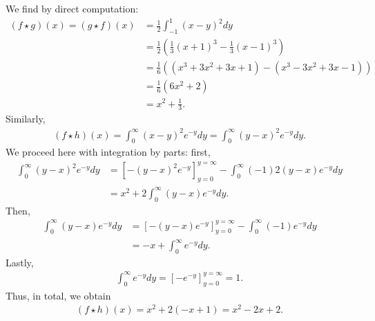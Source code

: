 \documentclass[11pt]{article}
\begin{document}
\begin{solution}
    We find by direct computation:
    \begin{align*}
        (f \star g)(x) = (g \star f)(x) 
        &
        = 
        \frac 1 2 \int_{-1}^1 (x - y)^2 dy
        \\&
        = 
        \frac 1 2 \left( \frac{1}{3} (x+1)^{3} - \frac{1}{3} (x-1)^{3} \right)
        \\&
        = 
        \frac 1 6 
        \left( 
            ( x^{3} + 3x^{2} + 3x + 1 )
            - 
            ( x^{3} - 3x^{2} + 3x - 1 )
        \right)
        \\&
        = 
        \frac 1 6 
        \left( 
            6x^{2} + 2
        \right)
        \\&
        = 
        x^2 + \frac 1 3
        .
    \end{align*}   
    Similarly,
    \begin{align*}
        (f \star h)(x) 
        = 
        \int_{0}^\infty (x - y)^2 e^{-y} dy 
        = 
        \int_{0}^\infty (y - x)^2 e^{-y} dy 
        .
    \end{align*}
    We proceed here with integration by parts: first, 
    \begin{align*}
        \int_{0}^\infty (y - x)^2 e^{-y} dy 
        &=
        \left[ - (y - x)^2 e^{-y} \right]_{y=0}^{y=\infty}
        -
        \int_{0}^\infty (-1)2(y - x) e^{-y} dy 
        \\
        &=
        x^2 
        +
        2
        \int_{0}^\infty (y - x) e^{-y} dy 
        .
    \end{align*}
    Then, 
    \begin{align*}
        \int_{0}^\infty (y - x) e^{-y} dy 
        &=
        \left[ - (y - x) e^{-y} \right]_{y=0}^{y=\infty}
        -
        \int_{0}^\infty (-1) e^{-y} dy 
        \\
        &=
        -x 
        +
        \int_{0}^\infty e^{-y} dy 
        .
    \end{align*}
    Lastly,
    \begin{align*}
        \int_{0}^\infty e^{-y} dy = \left[ - e^{-y} \right]_{y=0}^{y=\infty} = 1
        .
    \end{align*}
    Thus, in total, we obtain 
    \begin{align*}
        (f \star h)(x) 
        =
        x^{2} + 2 \left( -x + 1 \right) = x^{2} - 2 x + 2.
    \end{align*}
\end{solution}
\end{document}
